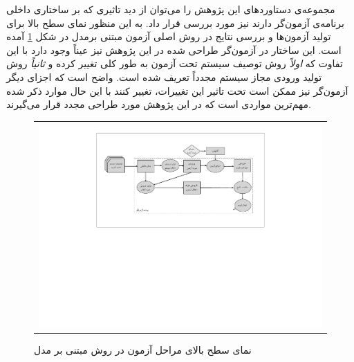 مجموعه‌ی دستاوردهای این پژوهش را می‌توان از دید تاثیری که بر ساختاری داخلی برنامه‌ی آزمون‌گر دارند نیز مورد بررسی قرار داد. به این منظور نمای سطح بالا برای تولید آزمون‌ها و بررسی نتایج در روش اصلی آزمون مبتنی برمدل در شکل \ref{fig:mbtOverview} آمده است. این ساختار در آزمون‌گر طراحی شده در این پژوهش نیز عیناً وجود دارد با این تفاوت که \textit{اولاً} روش توصیف سیستم تحت آزمون به طور کلی تغییر کرده و \textit{ثانیاً} روش تولید ورودی مجاز سیستم مجدداً تعریف شده است. واضح است که اجزای دیگر آزمون‌گر نیز ممکن است تحت تاثیر این تغییرات، تغییر کنند با این حال موارد ذکر شده مهم‌ترین مواردی است که در این پژوهش مورد طراحی مجدد قرار می‌گیرند. 

\begin{figure}
    \begin{center}
    \begin{tabular}{| c |}
   	\hline
	\\
  	 \includegraphics[width=11cm]{2-Preliminaries/Figures/mbtOverview.pdf}
	\\
	\hline
  \end{tabular}
  \end{center}
   \caption{\label{fig:mbtOverview} نمای سطح بالای مراحل آزمون در روش مبتنی بر مدل \cite{utting06}}
\end{figure}



